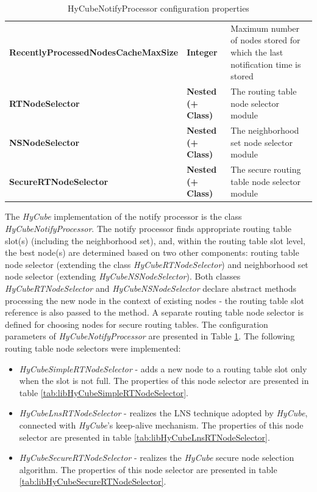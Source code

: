 \begin{table}
\begin{center}
\begin{tabular}{p{4.8cm} p{2.2cm} p{7.5cm}}
	\textbf{RecentlyProcessedNodesCacheMaxSize}				& \textbf{Integer}		& Maximum number of nodes stored for which the last notification time is stored		\\[1.5mm]
	\textbf{RTNodeSelector}									& \textbf{Nested (+ Class)}		& The routing table node selector module									\\[1.5mm]
	\textbf{NSNodeSelector}									& \textbf{Nested (+ Class)}		& The neighborhood set node selector module									\\[1.5mm]
	\textbf{SecureRTNodeSelector}							& \textbf{Nested (+ Class)}		& The secure routing table node selector module								\\[1.5mm]
    \hline
\end{tabular}
\end{center}
\caption{HyCubeNotifyProcessor configuration properties}
\label{tab:libHyCubeNotifyProcessor}
\end{table}


The \emph{HyCube} implementation of the notify processor is the class \emph{HyCubeNotifyProcessor}. The notify processor finds appropriate routing table slot(s) (including the neighborhood set), and, within the routing table slot level, the best node(s) are determined based on two other components: routing table node selector (extending the class \emph{HyCubeRTNodeSelector}) and neighborhood set node selector (extending \emph{HyCubeNSNodeSelector}). Both classes \emph{HyCubeRTNodeSelector} and \emph{HyCubeNSNodeSelector} declare abstract methods processing the new node in the context of existing nodes - the routing table slot reference is also passed to the method. A separate routing table node selector is defined for choosing nodes for secure routing tables. The configuration parameters of \emph{HyCubeNotifyProcessor} are presented in Table \ref{tab:libHyCubeNotifyProcessor}. The following routing table node selectors were implemented:

\begin{itemize}
	\renewcommand{\labelitemi}{$\bullet$}
	\item \emph{HyCubeSimpleRTNodeSelector} - adds a new node to a routing table slot only when the slot is not full. The properties of this node selector are presented in table \ref{tab:libHyCubeSimpleRTNodeSelector}.
	\item \emph{HyCubeLnsRTNodeSelector} - realizes the LNS technique adopted by \emph{HyCube}, connected with \emph{HyCube}'s keep-alive mechanism. The properties of this node selector are presented in table \ref{tab:libHyCubeLnsRTNodeSelector}.
	\item \emph{HyCubeSecureRTNodeSelector} - realizes the \emph{HyCube} secure node selection algorithm. The properties of this node selector are presented in table \ref{tab:libHyCubeSecureRTNodeSelector}.
\end{itemize}

